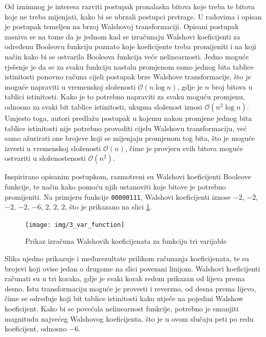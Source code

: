 Od iznimnog je interesa razviti postupak pronalaska bitova koje treba te bitova koje ne treba mijenjati, kako bi se ubrzali postupci pretrage.
U radovima \cite{millan1997smart} i \cite{millan1999boolean} opisan je postupak temeljen na brzoj Walshovoj transformaciji.
Opisani postupak zasniva se na tome da je jednom kad se izračunaju Walshovi koeficijenti za određenu Booleovu funkciju poznato koje koeficijente treba promijeniti i na koji način kako bi se ostvarila Booleova funkcija veće nelinearnosti.
Jedno moguće rješenje je da se za svaku funkciju nastalu promjenom samo jednog bita tablice istinitosti ponovno računa cijeli postupak brze Walshove transformacije, što je moguće napraviti u vremenskoj složenosti $\mathcal{O}(n\log n)$, gdje je $n$ broj bitova u tablici istinitosti.
Kako je to potrebno napraviti za svaku moguću promjenu, odnosno za svaki bit tablice istinitosti, ukupna složenost iznosi $\mathcal{O}(n^2\log n)$.
Umjesto toga, autori predlažu postupak u kojemu nakon promjene jednog bita tablice istinitosti nije potrebno provoditi cijelu Walshovu transformaciju, već samo ažurirati one brojeve koji se mijenjaju promjenom tog bita, što je moguće izvesti u vremenskoj složenosti $\mathcal{O}(n)$, čime je provjeru svih bitova moguće ostvariti u složenostenosti $\mathcal{O}(n^2)$.

Inspirirano opisanim postupkom, razmotreni su Walshovi koeficijenti Booleove funkcije, te način kako pomoću njih ustanoviti koje bitove je potrebno promijeniti.
Na primjeru funkcije \texttt{00000111}, Walshovi koeficijenti iznose $-2$, $-2$, $-2$, $-2$, $-6$, $2$, $2$, $2$, što je prikazano na slici \ref{fig:3_var_function}.
\begin{figure}[ht!] 
    \centering
    \texttt{[image: img/3\_var\_function]}
    \captionsetup{justification=centering}
    \caption{Prikaz izračuna Walshovih koeficijenata za funkciju tri varijable}
    \label{fig:3_var_function}
\end{figure}
Slika ujedno prikazuje i međurezultate prilikom računanja koeficijenata, te su brojevi koji ovise jedan o drugome na slici povezani linijom.
Walshovi koeficijenti računati su u tri koraka, gdje je svaki korak redom prikazan od lijeva prema desno.
Istu transformaciju moguće je provesti i reverzno, od desna prema lijevo, čime se određuje koji bit tablice istinitosti kako utječe na pojedini Walshow koeficijent.
Kako bi se povećala nelinearnost funkcije, potrebno je smanjiti magnitudu najvećeg Walshovog koeficijenta, što je u ovom slučaju peti po redu koeficijent, odnosno $-6$.

